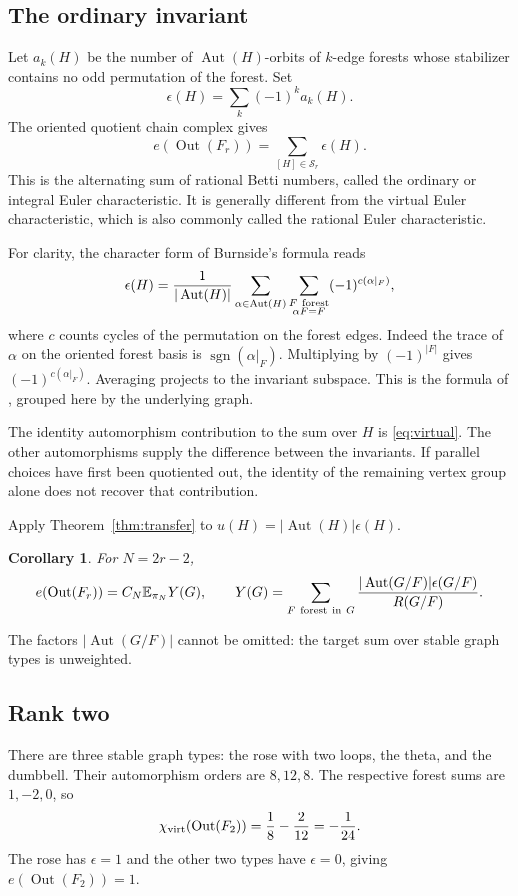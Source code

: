 \documentclass[11pt]{article}
\newtheorem{corollary}[theorem]{Corollary}
\theoremstyle{definition}
\newcommand{\Aut}{\operatorname{Aut}}
\newcommand{\Out}{\operatorname{Out}}
\newcommand{\E}{\mathbb E}
\numberwithin{equation}{section}
\begin{document}
\subsection{The ordinary invariant}
Let $a_k(H)$ be the number of $\Aut(H)$-orbits of $k$-edge forests
whose stabilizer contains no odd permutation of the forest. Set
\begin{equation}\label{eq:epsilon}
 \epsilon(H)=\sum_k(-1)^k a_k(H).
\end{equation}
The oriented quotient chain complex gives
\[
 e(\Out(F_r))=\sum_{[H]\in\mathcal S_r}\epsilon(H).
\]
This is the alternating sum of rational Betti numbers, called the
ordinary or integral Euler characteristic. It is generally different
from the virtual Euler characteristic, which is also commonly called
the rational Euler characteristic.

For clarity, the character form of Burnside's formula reads
\begin{equation}\label{eq:burnside}
 \epsilon(H)=\frac1{|\Aut(H)|}
  \sum_{\alpha\in\Aut(H)}
   \sum_{\substack{F\ {\rm forest}\\\alpha F=F}}
                         (-1)^{c(\alpha|_F)},
\end{equation}
where $c$ counts cycles of the permutation on the forest edges.
Indeed the trace of $\alpha$ on the oriented forest basis is
$\operatorname{sgn}(\alpha|_F)$. Multiplying by $(-1)^{|F|}$ gives
$(-1)^{c(\alpha|_F)}$. Averaging projects to the invariant subspace.
This is the formula of \cite[Theorem 2.1]{BV2023}, grouped here by
the underlying graph.

The identity automorphism contribution to the sum over $H$ is
\eqref{eq:virtual}. The other automorphisms supply the difference
between the invariants. If parallel choices have first been
quotiented out, the identity of the remaining vertex group alone
does not recover that contribution.

Apply Theorem~\ref{thm:transfer} to
$u(H)=|\Aut(H)|\epsilon(H)$.
\begin{corollary}\label{cor:ordinary}
For $N=2r-2$,
\[
 e(\Out(F_r))=C_N\E_{\pi_N}Y(G),\qquad
 Y(G)=\sum_{F\ {\rm forest\ in}\ G}
       \frac{|\Aut(G/F)|\epsilon(G/F)}{R(G/F)}.
\]
\end{corollary}
The factors $|\Aut(G/F)|$ cannot be omitted: the target sum over
stable graph types is unweighted.

\subsection{Rank two}
There are three stable graph types: the rose with two loops, the theta,
and the dumbbell. Their automorphism orders are $8,12,8$.
The respective forest sums are $1,-2,0$, so
\[
 \chi_{\rm virt}(\Out(F_2))=\frac18-\frac2{12}=-\frac1{24}.
\]
The rose has $\epsilon=1$ and the other two types have $\epsilon=0$,
giving $e(\Out(F_2))=1$.
\end{document}
